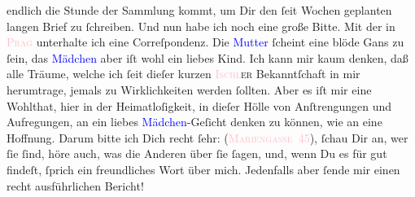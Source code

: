                endlich \strikeout{\textcolor{gray}{d}} die Stunde der Sammlung kommt, um Dir den ſeit Wochen geplanten langen Brief
               zu ſchreiben.\pend
           \pstart
           Und nun habe ich noch eine große Bitte. Mit der \label{K_L02831-45v}\label{K_L02831-45h} in \textsc{\textcolor{pink}{Prag}{}\ledrightnote{\textcolor{pink}{Prag}}} unterhalte ich eine Correſpondenz. Die \textcolor{blue}{Mutter}{} ſcheint eine blöde Gans zu ſein, das \textcolor{blue}{Mädchen}{} aber iſt wohl ein liebes Kind. Ich
               kann mir kaum \strikeout{\textcolor{gray}{de}} denken, daß alle Träume, welche ich ſeit dieſer kurzen \textsc{\textcolor{pink}{Ischl}{}\ledrightnote{\textcolor{pink}{Bad Ischl}}er} Bekanntſchaft in mir herumtrage,
               jemals {\pb}zu Wirklichkeiten werden ſollten. Aber es
               iſt mir eine Wohlthat, hier in der Heimatloſigkeit, in dieſer Hölle von Anſtrengungen
               und Aufregungen, an ein liebes \textcolor{blue}{Mädchen}{}-Geſicht denken zu können, wie an eine Hoffnung. Darum bitte ich Dich
               recht ſehr: \label{K_L02831-4v}\label{K_L02831-4h}
                  (\textsc{\textcolor{pink}{Mariengaſse 45}{}\ledrightnote{\textcolor{pink}{Mariannengasse}}}), ſchau Dir an, wer ſie ſind, höre auch, was die Anderen über ſie ſagen, und,
               wenn Du es für gut findeſt, ſprich ein freundliches Wort über mich. Jedenfalls {\pb}aber ſende mir einen recht ausführlichen Bericht!
